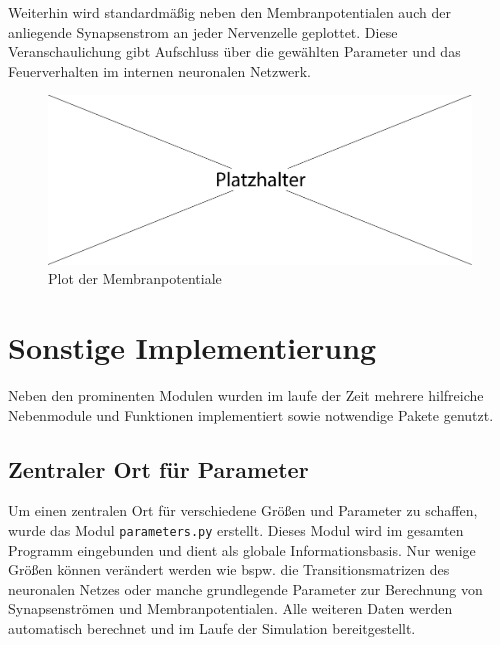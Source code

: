 	Weiterhin wird standardmäßig neben den Membranpotentialen auch der anliegende Synapsenstrom an jeder Nervenzelle geplottet. Diese Veranschaulichung gibt Aufschluss über die gewählten Parameter und das Feuerverhalten im internen neuronalen Netzwerk.\\
	\begin{figure}[!h] %
		\centering
		\includegraphics[width=12cm]{figures/sonstiges/platzhalter.pdf}
		\caption{Plot der Membranpotentiale }
		\label{fig:imp_plot_1}
	\end{figure}

\section{Sonstige Implementierung}
\label{sec:imp_vis}
	Neben den prominenten Modulen wurden im laufe der Zeit mehrere hilfreiche Nebenmodule und Funktionen implementiert sowie notwendige Pakete genutzt.
	\subsection{Zentraler Ort für Parameter}
		Um einen zentralen Ort für verschiedene Größen und Parameter zu schaffen, wurde das Modul \texttt{parameters.py} erstellt. Dieses Modul wird im gesamten Programm eingebunden und dient als globale Informationsbasis. Nur wenige Größen können verändert werden wie bspw. die Transitionsmatrizen des neuronalen Netzes oder manche grundlegende Parameter zur Berechnung von Synapsenströmen und Membranpotentialen. Alle weiteren Daten werden automatisch berechnet und im Laufe der Simulation bereitgestellt.
